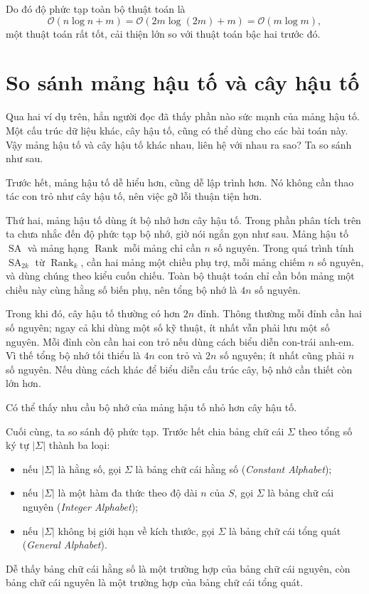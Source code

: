 \documentclass[11pt]{article}
\newcommand{\Oh}{\mathcal{O}}
\newcommand{\SA}{\operatorname{SA}}
\newcommand{\Rank}{\operatorname{Rank}}
\begin{document}
Do đó độ phức tạp toàn bộ thuật toán là
\[
  \Oh(n\log n+m)=\Oh(2m\log(2m)+m)=\Oh(m\log m),
\]
một thuật toán rất tốt, cải thiện lớn so với thuật toán bậc hai trước đó.

\section{So sánh mảng hậu tố và cây hậu tố}

Qua hai ví dụ trên, hẳn người đọc đã thấy phần nào sức mạnh của mảng hậu tố.
Một cấu trúc dữ liệu khác, cây hậu tố, cũng có thể dùng cho các bài toán này.
Vậy mảng hậu tố và cây hậu tố khác nhau, liên hệ với nhau ra sao? Ta so sánh
như sau.

Trước hết, mảng hậu tố dễ hiểu hơn, cũng dễ lập trình hơn. Nó không cần thao
tác con trỏ như cây hậu tố, nên việc gỡ lỗi thuận tiện hơn.

Thứ hai, mảng hậu tố dùng ít bộ nhớ hơn cây hậu tố. Trong phần phân tích trên
ta chưa nhắc đến độ phức tạp bộ nhớ, giờ nói ngắn gọn như sau. Mảng hậu tố
\(\SA\) và mảng hạng \(\Rank\) mỗi mảng chỉ cần \(n\) số nguyên. Trong quá
trình tính \(\SA_{2k}\) từ \(\Rank_k\), cần hai mảng một chiều phụ trợ, mỗi
mảng chiếm \(n\) số nguyên, và dùng chúng theo kiểu cuốn chiếu. Toàn bộ thuật
toán chỉ cần bốn mảng một chiều này cùng hằng số biến phụ, nên tổng bộ nhớ là
\(4n\) số nguyên.

Trong khi đó, cây hậu tố thường có hơn \(2n\) đỉnh. Thông thường mỗi đỉnh cần
hai số nguyên; ngay cả khi dùng một số kỹ thuật, ít nhất vẫn phải lưu một số
nguyên. Mỗi đỉnh còn cần hai con trỏ nếu dùng cách biểu diễn con-trái anh-em.
Vì thế tổng bộ nhớ tối thiểu là \(4n\) con trỏ và \(2n\) số nguyên; ít nhất
cũng phải \(n\) số nguyên. Nếu dùng cách khác để biểu diễn cấu trúc cây, bộ
nhớ cần thiết còn lớn hơn.

Có thể thấy nhu cầu bộ nhớ của mảng hậu tố nhỏ hơn cây hậu tố.

Cuối cùng, ta so sánh độ phức tạp. Trước hết chia bảng chữ cái \(\Sigma\)
theo tổng số ký tự \(|\Sigma|\) thành ba loại:
\begin{itemize}
  \item nếu \(|\Sigma|\) là hằng số, gọi \(\Sigma\) là bảng chữ cái hằng số
  (\textit{Constant Alphabet});
  \item nếu \(|\Sigma|\) là một hàm đa thức theo độ dài \(n\) của \(S\), gọi
  \(\Sigma\) là bảng chữ cái nguyên (\textit{Integer Alphabet});
  \item nếu \(|\Sigma|\) không bị giới hạn về kích thước, gọi \(\Sigma\) là
  bảng chữ cái tổng quát (\textit{General Alphabet}).
\end{itemize}
Dễ thấy bảng chữ cái hằng số là một trường hợp của bảng chữ cái nguyên, còn
bảng chữ cái nguyên là một trường hợp của bảng chữ cái tổng quát.
\end{document}
